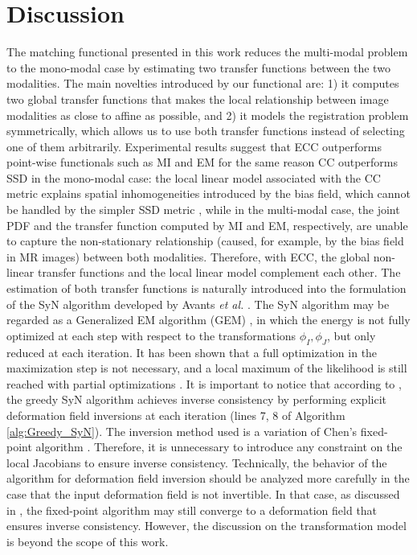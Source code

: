 \section{Discussion}
The matching functional presented in this work reduces the multi-modal problem to the mono-modal case by estimating two transfer functions between the two modalities. The main novelties introduced by our functional are: 1) it computes two global transfer functions that makes the local relationship between image modalities as close to affine as possible, and 2) it models the registration problem symmetrically, which allows us to use both transfer functions instead of selecting one of them arbitrarily. Experimental results suggest that ECC outperforms point-wise functionals such as MI and EM for the same reason CC outperforms SSD in the mono-modal case: the local linear model associated with the CC metric explains spatial inhomogeneities introduced by the bias field, which cannot be handled by the simpler SSD metric \cite{Wang2014}, while in the multi-modal case, the joint PDF and the transfer function computed by MI and EM, respectively, are unable to capture the non-stationary relationship (caused, for example, by the bias field in MR images) between both modalities. Therefore, with ECC, the global non-linear transfer functions and the local linear model complement each other. The estimation of both transfer functions is naturally introduced into the formulation of the SyN algorithm developed by Avants {\it et al.} \cite{Avants2008, Avants2011}. The SyN algorithm may be regarded as a Generalized EM algorithm (GEM) \cite{Neal1998}, in which the energy is not fully optimized at each step with respect to the transformations $\phi_{I}, \phi_{J}$, but only reduced at each iteration. It has been shown that a full optimization in the maximization step is not necessary, and a local maximum of the likelihood is still reached with partial optimizations \cite{Neal1998}. It is important to notice that according to \cite{Avants2008}, the greedy SyN algorithm achieves inverse consistency by performing explicit deformation field inversions at each iteration (lines 7, 8 of Algorithm \ref{alg:Greedy_SyN}). The inversion method used is a variation of Chen's fixed-point algorithm \cite{Chen2008}. Therefore, it is unnecessary to introduce any constraint on the local Jacobians to ensure inverse consistency. Technically, the behavior of the algorithm for deformation field inversion should be analyzed more carefully in the case that the input deformation field is not invertible. In that case, as discussed in \cite{Chen2008}, the fixed-point algorithm may still converge to a deformation field that ensures inverse consistency. However, the discussion on the transformation model is beyond the scope of this work.\\

